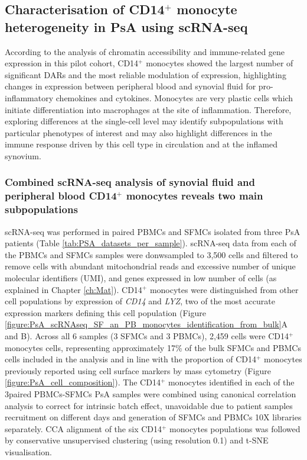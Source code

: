 \subsection{Characterisation of CD14$^+$ monocyte heterogeneity in PsA using scRNA-seq}
According to the analysis of chromatin accessibility and immune-related gene expression in this pilot cohort, CD14$^+$ monocytes showed the largest number of significant DARs and the most reliable modulation of expression, highlighting changes in expression between peripheral blood and synovial fluid for pro-inflammatory chemokines and cytokines. Monocytes are very plastic cells which initiate differentiation into macrophages at the site of inflammation. Therefore, exploring differences at the single-cell level may identify subpopulations with particular phenotypes of interest and may also highlight differences in the immune response driven by this cell type in circulation and at the inflamed synovium.


\subsubsection{Combined scRNA-seq analysis of synovial fluid and peripheral blood CD14$^+$ monocytes reveals two main subpopulations}
scRNA-seq was performed in paired PBMCs and SFMCs isolated from three PsA patients (Table \ref{tab:PSA_datasets_per_sample}). scRNA-seq data from each of the PBMCs and SFMCs samples were donwsampled to 3,500 cells and filtered to remove cells with abundant mitochondrial reads and excessive number of unique molecular identifiers (UMI), and genes expressed in low number of cells (as explained in Chapter \ref{ch:Mat}). CD14$^+$ monocytes were distinguished from other cell populations by expression of \textit{CD14} and \textit{LYZ}, two of the most accurate expression markers defining this cell population (Figure \ref{figure:PsA_scRNAseq_SF_an_PB_monocytes_identification_from_bulk}A and B). Across all 6 samples (3 SFMCs and 3 PBMCs), 2,459 cells were CD14$^+$ monocytes cells, representing approximately 17\% of the bulk SFMCs and PBMCs cells included in the analysis and in line with the proportion of CD14$^+$ monocytes previously reported using cell surface markers by mass cytometry  (Figure \ref{figure:PsA_cell_composition}). The CD14$^+$ monocytes identified in each of the 3paired PBMCs-SFMCs PsA samples were combined using canonical correlation analysis to correct for intrinsic batch effect, unavoidable due to patient samples recruitment on different days and generation of SFMCs and PBMCs 10X libraries separately. CCA alignment of the six CD14$^+$ monocytes populations was followed by conservative unsupervised clustering (using resolution 0.1) and t-SNE visualisation. 



